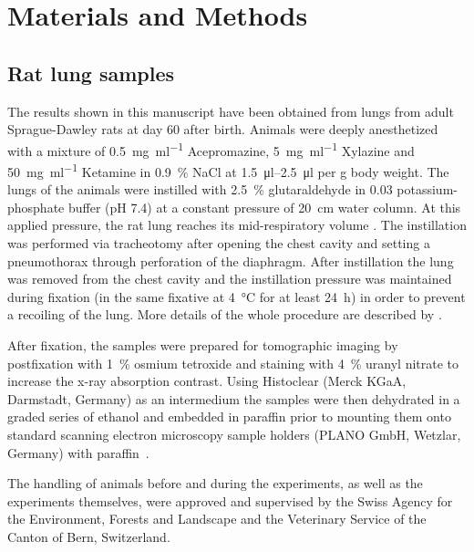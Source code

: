 \documentclass[%
	paper=a4,%
	abstract=true,%
	]{scrartcl}
\begin{document}
\section{Materials and Methods}
\subsection{Rat lung samples}
The results shown in this manuscript have been obtained from lungs from adult Sprague-Dawley rats at day 60 after birth. Animals were deeply anesthetized with a mixture of %
\SI{0.5}{\milli\gram\per\milli\litre} Acepromazine, %
\SI{5}{\milli\gram\per\milli\litre} Xylazine and %
\SI{50}{\milli\gram\per\milli\litre} Ketamine in %
\SI{0.9}{\percent} NaCl at \SIrange{1.5}{2.5}{\micro\litre} per \si{\gram} body weight. The lungs of the animals were instilled with \SI{2.5}{\percent} glutaraldehyde in \SI{0.03}{\Molar} potassium-phosphate buffer (pH 7.4) at a constant pressure of \SI{20}{\centi\meter} water column. At this applied pressure, the rat lung reaches its mid-respiratory volume \cite{Schittny1998}. The instillation was performed via tracheotomy after opening the chest cavity and setting a pneumothorax through perforation of the diaphragm. After instillation the lung was removed from the chest cavity and the instillation pressure was maintained during fixation (in the same fixative at \SI{4}{\celsius} for at least \SI{24}{\hour}) in order to prevent a recoiling of the lung. More details of the whole procedure are described by \citet{Tschanz2002}.

After fixation, the samples were prepared for tomographic imaging by postfixation with \SI{1}{\percent} osmium tetroxide and staining with \SI{4}{\percent} uranyl nitrate to increase the x-ray absorption contrast. Using Histoclear (Merck KGaA, Darmstadt, Germany) as an intermedium the samples were then dehydrated in a graded series of ethanol and embedded in paraffin prior to mounting them onto standard scanning electron microscopy sample holders (PLANO GmbH, Wetzlar, Germany) with paraffin~\cite{Tsuda2008}.

The handling of animals before and during the experiments, as well as the experiments themselves, were approved and supervised by the Swiss Agency for the Environment, Forests and Landscape and the Veterinary Service of the Canton of Bern, Switzerland.
\end{document}
